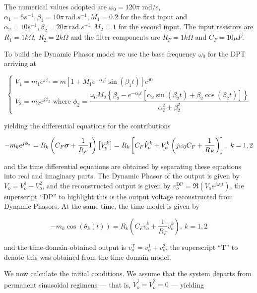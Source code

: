 	The numerical values adopted are $\omega_0=120\pi$ rad/s, $\alpha_1=5s^{-1},\beta_1=10\pi\ \text{rad}.s^{-1},M_1=0.2$ for the first input and $\alpha_2=10s^{-1},\beta_2=20\pi\ \text{rad}.s^{-1},M_2=1$ for the second input. The input resistors are $R_1 = 1k\Omega,\ R_2 = 2k\Omega$ and the filter components are $R_F = 1k\Omega$ and $C_F = 10\mu F$.

	To build the Dynamic Phasor model we use the base frequency $\omega_0$ for the DPT arriving at

\begin{equation}\left\{\begin{array}{l} V_1 = m_1e^{j\phi_1} = m\left[1 + M_1e^{-\alpha_1 t}\sin\left(\beta_1 t\right)\right]e^{j0} \\[5mm] V_2 = m_2e^{j\phi_2} \text{ where } \phi_2 = \dfrac{\omega_0 M_2\left\{\beta_2 - e^{-\alpha_2 t}\left[\alpha_2\sin\left(\beta_2 t\right) + \beta_2\cos\left(\beta_2 t\right)\right]\right\}}{\alpha_2^2 + \beta_2^2} \end{array}\right. \end{equation}

	\noindent yielding the differential equations for the contributions

\begin{equation} -m_ke^{j\phi_k} = R_k\left( C_F \boldsymbol{\sigma} + \dfrac{1}{R_F} \mathbf{I} \right) \left[ V_o^k\right] = R_k\left[C_F\dot{V}_o^k + V_o^k\left(j\omega_0C_F + \dfrac{1}{R_F}\right)\right],\ k=1,2 \label{eq:dpo_sim_dpmodel} \end{equation}

	\noindent and the time differential equations are obtained by separating these equations into real and imaginary parts. The Dynamic Phasor of the output is given by $V_o = V_o^1 + V_o^2$, and the reconstructed output is given by $v_o^{\text{DP}} = \Re\left(V_oe^{j\omega_0 t}\right)$, the superscript ``DP'' to highlight this is the output voltage reconstructed from Dynamic Phasors. At the same time, the time model is given by

\begin{equation} -m_k\cos\left(\theta_k(t)\right) = R_k\left(C_F\dot{v}_o^k + \dfrac{1}{R_F}\dot{v}_o^k\right),\ k=1,2 \label{eq:dpo_sim_timemodel} \end{equation}

	\noindent and the time-domain-obtained output is $v_o^{\text{T}} = v_o^1 + v_o^2$, the superscript ``T'' to denote this was obtained from the time-domain model.

	We now calculate the initial conditions. We assume that the system departs from permanent sinusoidal regimens — that is, $\dot{V}_o^1 = \dot{V}_o^2 = 0$ — yielding

